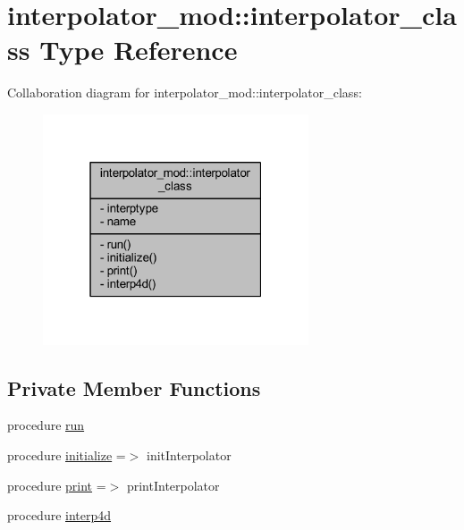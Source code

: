 \hypertarget{structinterpolator__mod_1_1interpolator__class}{}\section{interpolator\+\_\+mod\+:\+:interpolator\+\_\+class Type Reference}
\label{structinterpolator__mod_1_1interpolator__class}


Collaboration diagram for interpolator\+\_\+mod\+:\+:interpolator\+\_\+class\+:\nopagebreak
\begin{figure}[H]
\begin{center}
\leavevmode
\includegraphics[width=223pt]{structinterpolator__mod_1_1interpolator__class__coll__graph}
\end{center}
\end{figure}
\subsection*{Private Member Functions}
\begin{DoxyCompactItemize}
\item 
procedure \mbox{\hyperlink{structinterpolator__mod_1_1interpolator__class_a1080aca342174069db9c5639853d5dc0}{run}}
\item 
procedure \mbox{\hyperlink{structinterpolator__mod_1_1interpolator__class_a6911f5a4e2cbe3fcd8fbfce906429436}{initialize}} =$>$ init\+Interpolator
\item 
procedure \mbox{\hyperlink{structinterpolator__mod_1_1interpolator__class_a4b3112a37f09901a223d8cc3d81be4dd}{print}} =$>$ print\+Interpolator
\item 
procedure \mbox{\hyperlink{structinterpolator__mod_1_1interpolator__class_a5ee1db117f9411f5969b139499bd61ea}{interp4d}}
\end{DoxyCompactItemize}
